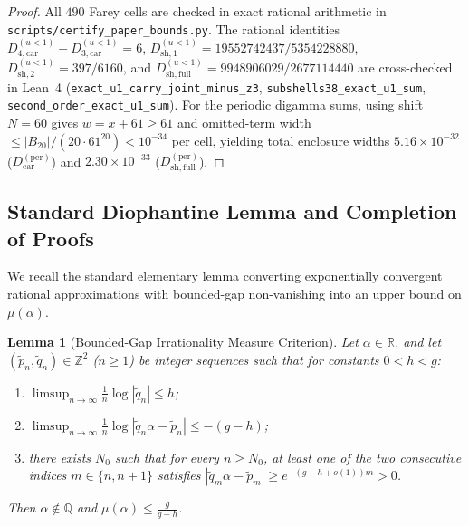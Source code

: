 \documentclass[11pt,reqno]{amsart}
\newtheorem{lemma}[theorem]{Lemma}
\theoremstyle{definition}
\theoremstyle{remark}
\newcommand{\QQ}{\mathbb{Q}}
\newcommand{\ZZ}{\mathbb{Z}}
\newcommand{\RR}{\mathbb{R}}
\begin{document}
\begin{proof}
All $490$ Farey cells are checked in exact rational arithmetic in \texttt{scripts/\allowbreak certify\_\allowbreak paper\_\allowbreak bounds.py}. The rational identities $D_{4,\mathrm{car}}^{(u<1)} - D_{3,\mathrm{car}}^{(u<1)} = 6$, $D_{\mathrm{sh},1}^{(u<1)} =\allowbreak 19552742437 /\allowbreak 5354228880$, $D_{\mathrm{sh},2}^{(u<1)} = 397/6160$, and $D_{\mathrm{sh},\mathrm{full}}^{(u<1)} =\allowbreak 9948906029 /\allowbreak 2677114440$ are cross-checked in Lean~4 (\texttt{exact\_\allowbreak u1\_\allowbreak carry\_\allowbreak joint\_\allowbreak minus\_z3}, \texttt{subshells38\_\allowbreak exact\_\allowbreak u1\_sum}, \texttt{second\_\allowbreak order\_\allowbreak exact\_\allowbreak u1\_sum}). For the periodic digamma sums, using shift $N = 60$ gives $w = x + 61 \ge 61$ and omitted-term width $\le |B_{20}|/(20 \cdot 61^{20}) < 10^{-34}$ per cell, yielding total enclosure widths $5.16 \times 10^{-32}$ ($D_{\mathrm{car}}^{(\mathrm{per})}$) and $2.30 \times 10^{-33}$ ($D_{\mathrm{sh},\mathrm{full}}^{(\mathrm{per})}$).
\end{proof}

\subsection{Standard Diophantine Lemma and Completion of Proofs}
We recall the standard elementary lemma converting exponentially convergent rational approximations with bounded-gap non-vanishing into an upper bound on $\mu(\alpha)$.

\begin{lemma}[Bounded-Gap Irrationality Measure Criterion]
\label{lem:diophantine}
Let $\alpha \in \RR$, and let $(\widetilde{p}_n, \widetilde{q}_n) \in \ZZ^2$ ($n \ge 1$) be integer sequences such that for constants $0 < h < g$:
\begin{enumerate}
  \item[\emph{(i)}] $\limsup_{n\to\infty} \frac{1}{n}\log|\widetilde{q}_n| \le h$;
  \item[\emph{(ii)}] $\limsup_{n\to\infty} \frac{1}{n}\log|\widetilde{q}_n \alpha - \widetilde{p}_n| \le -(g - h)$;
  \item[\emph{(iii)}] there exists $N_0$ such that for every $n \ge N_0$, at least one of the two consecutive indices $m \in \{n, n+1\}$ satisfies $|\widetilde{q}_m \alpha - \widetilde{p}_m| \ge e^{-(g - h + o(1)) m} > 0$.
\end{enumerate}
Then $\alpha \notin \QQ$ and $\mu(\alpha) \le \frac{g}{g - h}$.
\end{lemma}
\end{document}
